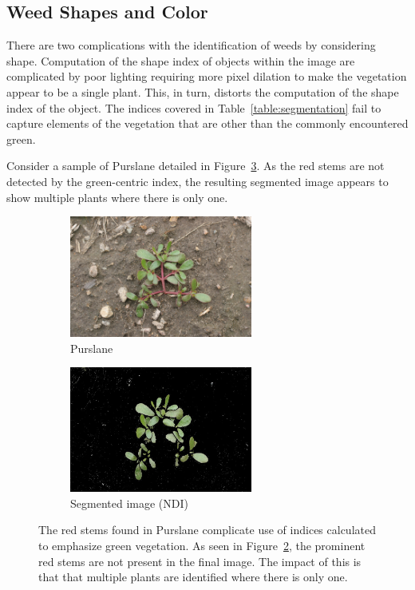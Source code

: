 \documentclass[letterpaper]{article}
\begin{document}
{\subsection{Weed Shapes and Color}
There are two complications with the identification of weeds by considering shape.  Computation of the shape index of objects within the image are complicated by poor lighting requiring more pixel dilation to make the vegetation appear to be a single plant. This, in turn, distorts the computation of the shape index of the object. The indices covered in Table~\ref{table:segmentation} fail to capture elements of the vegetation that are other than the commonly encountered green.

Consider a sample of Purslane detailed in Figure~\ref{fig:segmentation-problem}. As the red stems are not detected by the green-centric index, the resulting segmented image appears to show multiple plants where there is only one.

\begin{figure}[h!]
	\centering
	\begin{subfigure}[h]{.40\textwidth}
		\centering
		\includegraphics[width=6cm]{./figures/purslane.png}
		\caption{Purslane}
		\label{fig:purslane}
	\end{subfigure}
	\begin{subfigure}[h]{.40\textwidth}
		\centering
		\includegraphics[width=6cm]{./figures/purslane-segmented.jpg}
		\caption{Segmented image (NDI)}
		\label{fig:purslane-segmented}
	\end{subfigure}
	\caption[Color problems complicate segmentation]{The red stems found in Purslane complicate use of indices calculated to emphasize green vegetation. As seen in Figure~\ref{fig:purslane-segmented}, the prominent red stems are not present in the final image. The impact of this is that that multiple plants are identified where there is only one.}
	\label{fig:segmentation-problem}
\end{figure}

}
\end{document}
